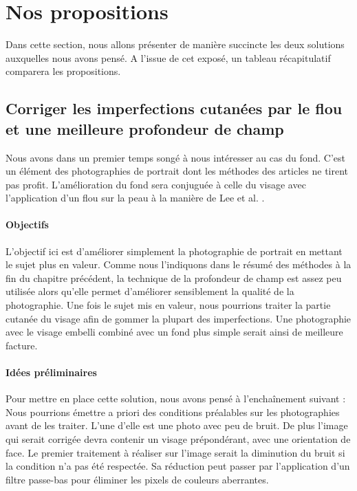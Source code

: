 \documentclass[11pt, french,screen]{report-rd-info}
\begin{document}
\section{Nos propositions}
Dans cette section, nous allons présenter de manière succincte les deux solutions auxquelles nous avons pensé. A l’issue de cet exposé, un tableau récapitulatif comparera les propositions.
\subsection{Corriger les imperfections cutanées par le flou et une meilleure profondeur de champ}
\label{propun}
Nous avons dans un premier temps songé à nous intéresser au cas du fond. C’est un élément des photographies de portrait dont les méthodes des articles ne tirent pas profit. L’amélioration du fond sera conjuguée à celle du visage avec l’application d’un flou sur la peau à la manière de Lee et al. \cite{Lee}.
\paragraph{Objectifs}
L’objectif ici est d’améliorer simplement la photographie de portrait en mettant le sujet plus en valeur. Comme nous l’indiquons dans le résumé des méthodes à la fin du chapitre précédent, la technique de la profondeur de champ est assez peu utilisée alors qu’elle permet d’améliorer sensiblement la qualité de la photographie. Une fois le sujet mis en valeur, nous pourrions traiter la partie cutanée du visage afin de gommer la plupart des imperfections. Une photographie avec le visage embelli combiné avec un fond plus simple serait ainsi de meilleure facture.
\paragraph{Idées préliminaires}
Pour mettre en place cette solution, nous avons pensé à l'enchaînement suivant :
Nous pourrions émettre a priori des conditions préalables sur les photographies avant de les traiter. L’une d’elle est une photo avec peu de bruit. De plus l’image qui serait corrigée devra contenir un visage prépondérant, avec une orientation de face.
Le premier traitement à réaliser sur l’image serait la diminution du bruit si la condition n’a pas été respectée. Sa réduction peut passer par l’application d’un filtre passe-bas pour éliminer les pixels de couleurs aberrantes.
\end{document}
